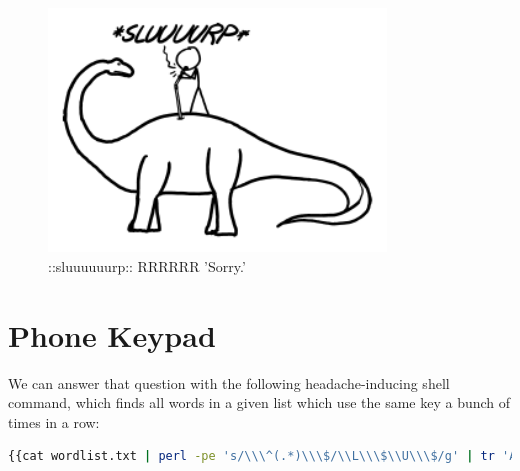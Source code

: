 {\begin{figure}[!htbp]
\centering
\includegraphics[scale=0.5, max width=0.8\textwidth]{imgs/a/74/soda_dinosaur.png}
\caption{::sluuuuuurp:: RRRRRR 'Sorry.'}
\end{figure}

{
\chapter{Phone Keypad}
}

\hfill{}

{We can answer that question with the following headache-inducing shell command, which finds all words in a given list which use the same key a bunch of times in a row:}

\begin{lstlisting}[language=bash]
{{cat wordlist.txt | perl -pe 's/\\\^(.*)\\\$/\\L\\\$\\U\\\$/g' | tr 'ABCDEFGHIJKLMNOPQRSTUVWXYZ' '2223334445556667777888999' | grep -P "(.)\\1\\1\\1\\1\\1"} }
\end{lstlisting}

}

